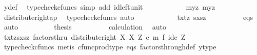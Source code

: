 \begin{isabellebody}
\ y{\isacharprime}{\kern0pt}{\isacharunderscore}{\kern0pt}def\ \isamarkupfalse%
\ {\isacharparenleft}{\kern0pt}typecheck{\isacharunderscore}{\kern0pt}cfuncs{\isacharcomma}{\kern0pt}\ simp\ add{\isacharcolon}{\kern0pt}\ id{\isacharunderscore}{\kern0pt}left{\isacharunderscore}{\kern0pt}unit{}{\isacharparenright}{\kern0pt}\isanewline
\ \ \ \ \ \ \isamarkupfalse%
\ \isamarkupfalse%
\ {\isachardoublequoteopen}{\isachardot}{\kern0pt}{\isachardot}{\kern0pt}{\isachardot}{\kern0pt}\ {\isacharequal}{\kern0pt}\ {\isasymlangle}{\isasymlangle}my{}{\isacharcomma}{\kern0pt}z{\isasymrangle}{\isacharcomma}{\kern0pt}\ {\isasymlangle}my{}{\isacharcomma}{\kern0pt}z{\isasymrangle}{\isasymrangle}{\isachardoublequoteclose}\isanewline
\ \ \ \ \ \ \ \ \isamarkupfalse%
\ distribute{\isacharunderscore}{\kern0pt}right{\isacharunderscore}{\kern0pt}ap\ \isamarkupfalse%
\ {\isacharparenleft}{\kern0pt}typecheck{\isacharunderscore}{\kern0pt}cfuncs{\isacharcomma}{\kern0pt}\ auto{\isacharparenright}{\kern0pt}\isanewline
\ \ \ \ \ \ \isamarkupfalse%
\ \isamarkupfalse%
\ {\isachardoublequoteopen}{\isachardot}{\kern0pt}{\isachardot}{\kern0pt}{\isachardot}{\kern0pt}\ {\isacharequal}{\kern0pt}\ {\isasymlangle}{\isasymlangle}tx{\isacharcomma}{\kern0pt}tz{\isasymrangle}{\isacharcomma}{\kern0pt}\ {\isasymlangle}sx{\isacharcomma}{\kern0pt}sz{\isasymrangle}{\isasymrangle}{\isachardoublequoteclose}\isanewline
\ \ \ \ \ \ \ \ \isamarkupfalse%
\ eqs\ \isamarkupfalse%
\ auto\isanewline
\ \ \ \ \ \ \isamarkupfalse%
\ \isamarkupfalse%
\ {\isacharquery}{\kern0pt}thesis\isanewline
\ \ \ \ \ \ \ \ \isamarkupfalse%
\ calculation\ \isamarkupfalse%
\ auto\isanewline
\ \ \ \ \isamarkupfalse%
\isanewline
\ \ \ \ \isamarkupfalse%
\ \isamarkupfalse%
\ {\isachardoublequoteopen}{\isasymlangle}{\isasymlangle}tx{\isacharcomma}{\kern0pt}tz{\isasymrangle}{\isacharcomma}{\kern0pt}{\isasymlangle}sx{\isacharcomma}{\kern0pt}sz{\isasymrangle}{\isasymrangle}\ factorsthru\ {\isacharparenleft}{\kern0pt}distribute{\isacharunderscore}{\kern0pt}right\ X\ X\ Z\ {\isasymcirc}\isactrlsub c\ m\ {\isasymtimes}\isactrlsub f\ id\isactrlsub c\ Z{\isacharparenright}{\kern0pt}{\isachardoublequoteclose}\isanewline
\ \ \ \ \ \ \isamarkupfalse%
\ {\isacharparenleft}{\kern0pt}typecheck{\isacharunderscore}{\kern0pt}cfuncs{\isacharcomma}{\kern0pt}\ metis\ cfunc{\isacharunderscore}{\kern0pt}prod{\isacharunderscore}{\kern0pt}type\ eqs\ factors{\isacharunderscore}{\kern0pt}through{\isacharunderscore}{\kern0pt}def{}\ y{\isacharprime}{\kern0pt}{\isacharunderscore}{\kern0pt}type{\isacharparenright}{\kern0pt}\isanewline

\end{isabellebody}
